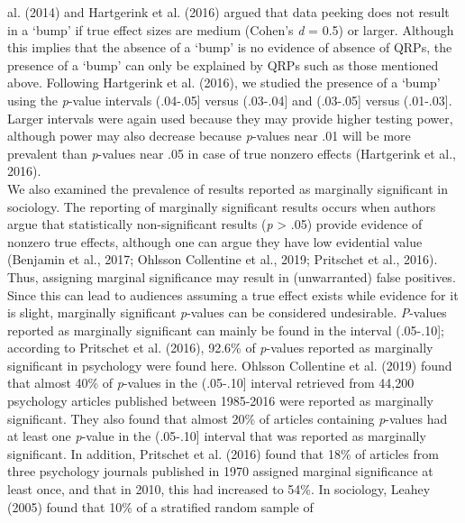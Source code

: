 \documentclass[
  12pt,
]{article}
\begin{document}
al. (2014) and Hartgerink et al. (2016) argued that data peeking does
not result in a `bump' if true effect sizes are medium (Cohen's \emph{d}
= 0.5) or larger. Although this implies that the absence of a `bump' is
no evidence of absence of QRPs, the presence of a `bump' can only be
explained by QRPs such as those mentioned above. Following Hartgerink et
al. (2016), we studied the presence of a `bump' using the \emph{p}-value
intervals (.04-.05{]} versus (.03-.04{]} and (.03-.05{]} versus
(.01-.03{]}. Larger intervals were again used because they may provide
higher testing power, although power may also decrease because
\emph{p}-values near .01 will be more prevalent than \emph{p}-values
near .05 in case of true nonzero effects (Hartgerink et al., 2016).\\
\hspace*{0.333em}\hspace*{0.333em}\hspace*{0.333em}\hspace*{0.333em}We
also examined the prevalence of results reported as marginally
significant in sociology. The reporting of marginally significant
results occurs when authors argue that statistically non-significant
results (\emph{p} \textgreater{} .05) provide evidence of nonzero true
effects, although one can argue they have low evidential value (Benjamin
et al., 2017; Ohlsson Collentine et al., 2019; Pritschet et al., 2016).
Thus, assigning marginal significance may result in (unwarranted) false
positives. Since this can lead to audiences assuming a true effect
exists while evidence for it is slight, marginally significant
\emph{p}-values can be considered undesirable. \emph{P}-values reported
as marginally significant can mainly be found in the interval
(.05-.10{]}; according to Pritschet et al. (2016), 92.6\% of
\emph{p}-values reported as marginally significant in psychology were
found here. Ohlsson Collentine et al. (2019) found that almost 40\% of
\emph{p}-values in the (.05-.10{]} interval retrieved from 44,200
psychology articles published between 1985-2016 were reported as
marginally significant. They also found that almost 20\% of articles
containing \emph{p}-values had at least one \emph{p}-value in the
(.05-.10{]} interval that was reported as marginally significant. In
addition, Pritschet et al. (2016) found that 18\% of articles from three
psychology journals published in 1970 assigned marginal significance at
least once, and that in 2010, this had increased to 54\%. In sociology,
Leahey (2005) found that 10\% of a stratified random sample of
\end{document}
